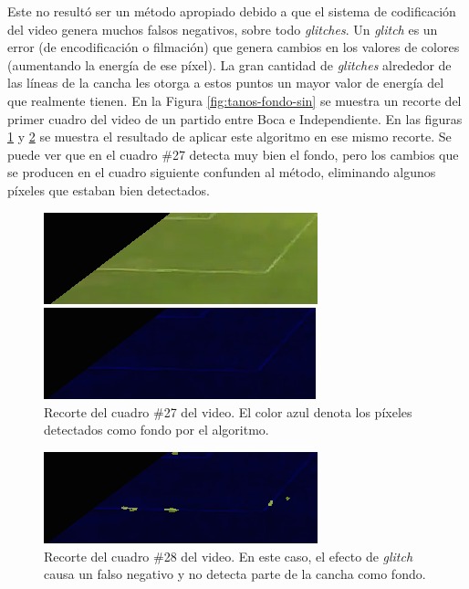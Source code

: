 Este no resultó ser un método apropiado debido a que el sistema de codificación
del video genera muchos falsos negativos, sobre todo \textit{glitches}. Un
\textit{glitch} es un error (de encodificación o filmación) que genera cambios
en los valores de colores (aumentando la energía de ese píxel). La gran
cantidad de \textit{glitches} alrededor de las líneas de la cancha les otorga a
estos puntos un mayor valor de energía del que realmente tienen. En la Figura
\ref{fig:tanos-fondo-sin} se muestra un recorte del primer cuadro del video de
un partido entre Boca e Independiente. En las figuras \ref{fig:tanos-fondo} y
\ref{fig:tanos-fondo-broken} se muestra el resultado de aplicar este algoritmo
en ese mismo recorte. Se puede ver que en el cuadro \#27 detecta muy bien el
fondo, pero los cambios que se producen en el cuadro siguiente confunden al
método, eliminando algunos píxeles que estaban bien detectados.

\begin{figure}[H]
  \centering
    \begin{minipage}[t]{.45\textwidth}
      \includegraphics[width=\linewidth]{./images/tanos-fondo-f1.png}
      \caption{Recorte del cuadro \#1 del video del partido entre Boca e Independiente
      \label{fig:tanos-fondo-sin}}
    \end{minipage}
    \begin{minipage}[t]{.45\textwidth}
      \includegraphics[width=\linewidth]{./images/tanos-fondo-f27.png}
      \caption{Recorte del cuadro \#27 del video. El color azul denota los píxeles detectados como fondo por el algoritmo.
      \label{fig:tanos-fondo}}
    \end{minipage}
  \end{figure}
  \begin{figure}[H]
  \centering
    \includegraphics[width=.45\linewidth]{./images/tanos-fondo-f28.png}
    \caption{Recorte del cuadro \#28 del video. En este caso, el efecto de \textit{glitch} causa un falso negativo y no detecta parte de la cancha como fondo.}
    \label{fig:tanos-fondo-broken}
\end{figure}

